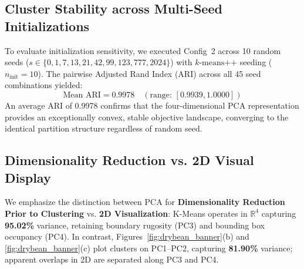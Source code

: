 \documentclass[10pt,onecolumn,letterpaper]{article}
\newcommand{\R}{\mathbb{R}}
\begin{document}
\subsection{Cluster Stability across Multi-Seed Initializations}
To evaluate initialization sensitivity, we executed Config~2 across 10 random seeds ($s \in \{0, 1, 7, 13, 21, 42, 99, 123, 777, 2024\}$) with $k\text{-means++}$ seeding ($n_{\text{init}}=10$). The pairwise Adjusted Rand Index (ARI) across all 45 seed combinations yielded:
\begin{equation}
\text{Mean ARI} = \mathbf{0.9978} \quad (\text{range: } [0.9939, 1.0000])
\end{equation}
An average ARI of 0.9978 confirms that the four-dimensional PCA representation provides an exceptionally convex, stable objective landscape, converging to the identical partition structure regardless of random seed.

\subsection{Dimensionality Reduction vs. 2D Visual Display}
We emphasize the distinction between PCA for \textbf{Dimensionality Reduction Prior to Clustering} vs. \textbf{2D Visualization}: K-Means operates in $\R^4$ capturing \textbf{95.02\%} variance, retaining boundary rugosity (PC3) and bounding box occupancy (PC4). In contrast, Figures~\ref{fig:drybean_banner}(b) and \ref{fig:drybean_banner}(c) plot clusters on PC1--PC2, capturing \textbf{81.90\%} variance; apparent overlaps in 2D are separated along PC3 and PC4.
\end{document}
